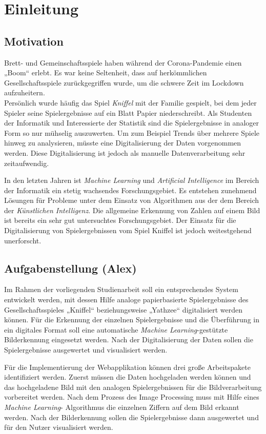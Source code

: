 \chapter{Einleitung}
\section{Motivation}
Brett- und Gemeinschaftsspiele haben während der Corona-Pandemie einen „Boom“ erlebt. Es war keine Seltenheit, dass auf herkömmlichen Gesellschaftsspiele zurückgegriffen wurde, um die schwere Zeit im Lockdown aufzuheitern. \cite{dw_2021}\\
Persönlich wurde häufig das Spiel \textit{Kniffel} mit der Familie gespielt, bei dem jeder Spieler seine Spielergebnisse auf ein Blatt Papier niederschreibt. Als Studenten der Informatik und Interessierte der Statistik sind die Spielergebnisse in analoger Form so nur mühselig auszuwerten. Um zum Beispiel Trends über mehrere Spiele hinweg zu analysieren, müsste eine Digitalisierung der Daten vorgenommen werden. Diese Digitalisierung ist jedoch als manuelle Datenverarbeitung sehr zeitaufwendig.

In den letzten Jahren ist \textit{Machine Learning} und \textit{Artificial Intelligence} im Bereich der Informatik ein stetig wachsendes Forschungsgebiet. 
Es entstehen zunehmend Lösungen für Probleme unter dem Einsatz von Algorithmen aus der dem Bereich der \textit{Künstlichen Intelligenz}. Die allgemeine Erkennung von Zahlen auf einem Bild ist bereits ein sehr gut untersuchtes Forschungsgebiet. Der Einsatz für die Digitalisierung von Spielergebnissen vom Spiel Kniffel ist jedoch weitestgehend unerforscht. 

\section{Aufgabenstellung (Alex)}
Im Rahmen der vorliegenden Studienarbeit soll ein entsprechendes System entwickelt werden, mit dessen Hilfe analoge papierbasierte Spielergebnisse des
Gesellschaftsspieles „Kniffel“ beziehungsweise „Yathzee“ digitalisiert werden können. Für die Erkennung der einzelnen Spielergebnisse und die Überführung in ein digitales Format soll eine automatische \textit{Machine Learning}-gestützte Bilderkennung eingesetzt werden. Nach der Digitalisierung der Daten sollen die Spielergebnisse ausgewertet und visualisiert werden.

Für die Implementierung der Webapplikation können drei große Arbeitspakete identifiziert werden. Zuerst müssen die Daten hochgeladen werden können und das hochgeladene Bild mit den analogen Spielergebnissen für die Bildverarbeitung vorbereitet werden. Nach dem Prozess des Image Processing muss mit Hilfe eines \textit{Machine Learning}-
Algorithmus die einzelnen Ziffern auf dem Bild erkannt werden.
Nach der Bilderkennung sollen die Spielergebnisse dann ausgewertet und für den Nutzer visualisiert werden.

